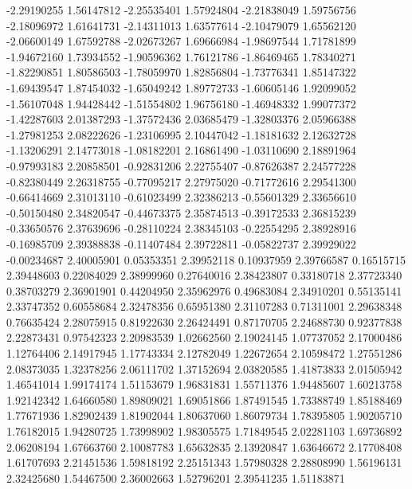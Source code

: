 -2.29190255  1.56147812  
-2.25535401  1.57924804  
-2.21838049  1.59756756  
-2.18096972  1.61641731  
-2.14311013  1.63577614  
-2.10479079  1.65562120  
-2.06600149  1.67592788  
-2.02673267  1.69666984  
-1.98697544  1.71781899  
-1.94672160  1.73934552  
-1.90596362  1.76121786  
-1.86469465  1.78340271  
-1.82290851  1.80586503  
-1.78059970  1.82856804  
-1.73776341  1.85147322  
-1.69439547  1.87454032  
-1.65049242  1.89772733  
-1.60605146  1.92099052  
-1.56107048  1.94428442  
-1.51554802  1.96756180  
-1.46948332  1.99077372  
-1.42287603  2.01387293  
-1.37572436  2.03685479  
-1.32803376  2.05966388  
-1.27981253  2.08222626  
-1.23106995  2.10447042  
-1.18181632  2.12632728  
-1.13206291  2.14773018  
-1.08182201  2.16861490  
-1.03110690  2.18891964  
-0.97993183  2.20858501  
-0.92831206  2.22755407  
-0.87626387  2.24577228  
-0.82380449  2.26318755  
-0.77095217  2.27975020  
-0.71772616  2.29541300  
-0.66414669  2.31013110  
-0.61023499  2.32386213  
-0.55601329  2.33656610  
-0.50150480  2.34820547  
-0.44673375  2.35874513  
-0.39172533  2.36815239  
-0.33650576  2.37639696  
-0.28110224  2.38345103  
-0.22554295  2.38928916  
-0.16985709  2.39388838  
-0.11407484  2.39722811  
-0.05822737  2.39929022  
-0.00234687  2.40005901  
0.05353351   2.39952118  
0.10937959   2.39766587  
0.16515715   2.39448603  
0.22084029   2.38999960  
0.27640016   2.38423807  
0.33180718   2.37723340  
0.38703279   2.36901901  
0.44204950   2.35962976  
0.49683084   2.34910201  
0.55135141   2.33747352  
0.60558684   2.32478356  
0.65951380   2.31107283  
0.71311001   2.29638348  
0.76635424   2.28075915  
0.81922630   2.26424491  
0.87170705   2.24688730  
0.92377838   2.22873431  
0.97542323   2.20983539  
1.02662560   2.19024145  
1.07737052   2.17000486  
1.12764406   2.14917945  
1.17743334   2.12782049  
1.22672654   2.10598472  
1.27551286   2.08373035  
1.32378256   2.06111702  
1.37152694   2.03820585  
1.41873833   2.01505942  
1.46541014   1.99174174  
1.51153679   1.96831831  
1.55711376   1.94485607  
1.60213758   1.92142342  
1.64660580   1.89809021  
1.69051866   1.87491545  
1.73388749   1.85188469  
1.77671936   1.82902439  
1.81902044   1.80637060  
1.86079734   1.78395805  
1.90205710   1.76182015  
1.94280725   1.73998902  
1.98305575   1.71849545  
2.02281103   1.69736892  
2.06208194   1.67663760  
2.10087783   1.65632835  
2.13920847   1.63646672  
2.17708408   1.61707693  
2.21451536   1.59818192  
2.25151343   1.57980328  
2.28808990   1.56196131  
2.32425680   1.54467500  
2.36002663   1.52796201  
2.39541235   1.51183871  
